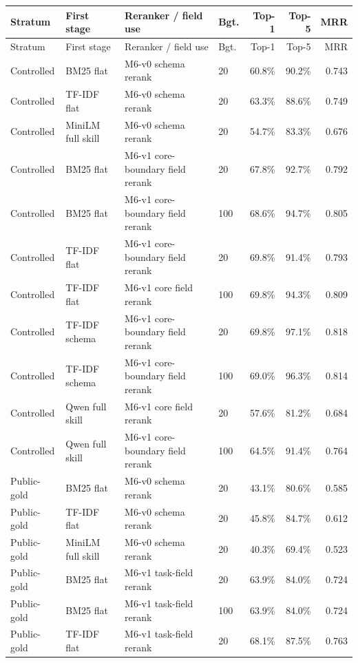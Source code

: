 {\scriptsize
\setlength{\tabcolsep}{2pt}
\begin{longtable}{@{}p{}p{}p{}p{}rrr@{}}
\toprule
Stratum & First stage & Reranker / field use & Bgt. & Top-1 & Top-5 & MRR \\
\midrule
\endfirsthead
\toprule
Stratum & First stage & Reranker / field use & Bgt. & Top-1 & Top-5 & MRR \\
\midrule
\endhead
\bottomrule
\endfoot
Controlled & BM25 flat & M6-v0 schema rerank & 20 & 60.8\% & 90.2\% & 0.743 \\
Controlled & TF-IDF flat & M6-v0 schema rerank & 20 & 63.3\% & 88.6\% & 0.749 \\
Controlled & MiniLM full skill & M6-v0 schema rerank & 20 & 54.7\% & 83.3\% & 0.676 \\
Controlled & BM25 flat & M6-v1 core-boundary field rerank & 20 & 67.8\% & 92.7\% & 0.792 \\
Controlled & BM25 flat & M6-v1 core-boundary field rerank & 100 & 68.6\% & 94.7\% & 0.805 \\
Controlled & TF-IDF flat & M6-v1 core-boundary field rerank & 20 & 69.8\% & 91.4\% & 0.793 \\
Controlled & TF-IDF flat & M6-v1 core field rerank & 100 & 69.8\% & 94.3\% & 0.809 \\
Controlled & TF-IDF schema & M6-v1 core-boundary field rerank & 20 & 69.8\% & 97.1\% & 0.818 \\
Controlled & TF-IDF schema & M6-v1 core-boundary field rerank & 100 & 69.0\% & 96.3\% & 0.814 \\
Controlled & Qwen full skill & M6-v1 core field rerank & 20 & 57.6\% & 81.2\% & 0.684 \\
Controlled & Qwen full skill & M6-v1 core-boundary field rerank & 100 & 64.5\% & 91.4\% & 0.764 \\
\midrule
Public-gold & BM25 flat & M6-v0 schema rerank & 20 & 43.1\% & 80.6\% & 0.585 \\
Public-gold & TF-IDF flat & M6-v0 schema rerank & 20 & 45.8\% & 84.7\% & 0.612 \\
Public-gold & MiniLM full skill & M6-v0 schema rerank & 20 & 40.3\% & 69.4\% & 0.523 \\
Public-gold & BM25 flat & M6-v1 task-field rerank & 20 & 63.9\% & 84.0\% & 0.724 \\
Public-gold & BM25 flat & M6-v1 task-field rerank & 100 & 63.9\% & 84.0\% & 0.724 \\
Public-gold & TF-IDF flat & M6-v1 task-field rerank & 20 & 68.1\% & 87.5\% & 0.763 \\

\end{longtable}}
